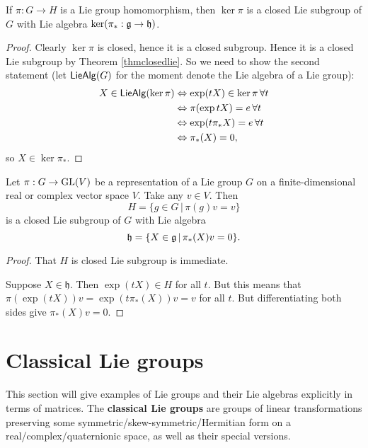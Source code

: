 \documentclass[11pt, english]{article}
\begin{document}
\begin{prop}
  If $\pi:G \to H$ is a Lie group homomorphism, then $\ker \pi$ is a closed Lie subgroup of $G$ with Lie algebra $\ker( \pi_\ast: \mathfrak g \to \mathfrak h)$.
\end{prop}

\begin{proof}
 Clearly $ \ker \pi$ is closed, hence it is a closed subgroup. Hence it is a closed Lie subgroup by Theorem \ref{thmclosedlie}. So we need to show the second statement (let $\mathsf{LieAlg}(G)$ for the moment denote the Lie algebra of a Lie group):
 \begin{align*}
 X \in \mathsf{LieAlg}(\ker \pi) &\Leftrightarrow \exp(tX) \in \ker \pi \, \forall t \\
&\Leftrightarrow \pi(\exp tX) = e \, \forall t \\
&\Leftrightarrow \exp(t \pi_\ast X) = e \, \forall t \\
&\Leftrightarrow \pi_\ast(X) = 0,
 \end{align*}
so $X \in \ker \pi_\ast$.
\end{proof}

\begin{prop}
\label{propfix}
  Let $\pi:G \to \operatorname{GL}(V)$ be a representation of a Lie group $G$ on a finite-dimensional real or complex vector space $V$. Take any $v \in V$. Then
$$
H = \{ g \in G \, | \, \pi(g) v = v \}
$$
is a closed Lie subgroup of $G$ with Lie algebra
$$
\mathfrak h = \{ X \in \mathfrak g \, | \, \pi_\ast(X) v = 0 \}.
$$
\end{prop}

\begin{proof}
 That $H$ is closed Lie subgroup is immediate.

Suppose $X \in \mathfrak h$. Then $\exp(t X) \in H$ for all $t$. But this means that $\pi(\exp(tX))v=\exp(t\pi_\ast( X))v = v$ for all $t$. But differentiating both sides give $\pi_\ast(X)v = 0$. 
\end{proof}


\newpage
\section{Classical Lie groups}

This section will give examples of Lie groups and their Lie algebras explicitly in terms of matrices. The \textbf{classical Lie groups} are groups of linear transformations preserving some symmetric/skew-symmetric/Hermitian form on a real/complex/quaternionic space, as well as their special versions. 
\end{document}
